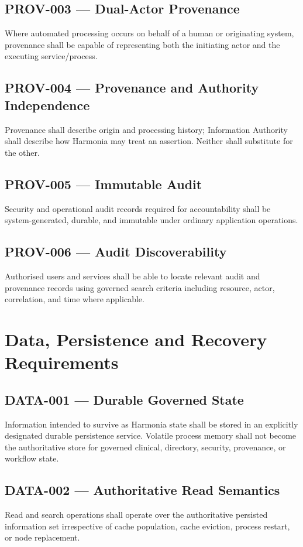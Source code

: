 \subsection{PROV-003 --- Dual-Actor Provenance}
Where automated processing occurs on behalf of a human or originating system, provenance shall be capable of representing both the initiating actor and the executing service/process.

\subsection{PROV-004 --- Provenance and Authority Independence}
Provenance shall describe origin and processing history; Information Authority shall describe how Harmonia may treat an assertion. Neither shall substitute for the other.

\subsection{PROV-005 --- Immutable Audit}
Security and operational audit records required for accountability shall be system-generated, durable, and immutable under ordinary application operations.

\subsection{PROV-006 --- Audit Discoverability}
Authorised users and services shall be able to locate relevant audit and provenance records using governed search criteria including resource, actor, correlation, and time where applicable.

\section{Data, Persistence and Recovery Requirements}

\subsection{DATA-001 --- Durable Governed State}
Information intended to survive as Harmonia state shall be stored in an explicitly designated durable persistence service. Volatile process memory shall not become the authoritative store for governed clinical, directory, security, provenance, or workflow state.

\subsection{DATA-002 --- Authoritative Read Semantics}
Read and search operations shall operate over the authoritative persisted information set irrespective of cache population, cache eviction, process restart, or node replacement.

